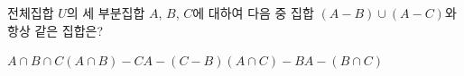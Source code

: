 전체집합 $U$의 세 부분집합 $A$, $B$, $C$에 대하여 다음 중 집합 $(A-B)\cup(A-C)$와 항상 같은 집합은?
\begin{choicesii}{$A\cap B\cap C$}{$(A\cap B)-C$}{$A-(C-B)$}{$(A\cap C)-B$}{$A-(B\cap C)$}\end{choicesii}
